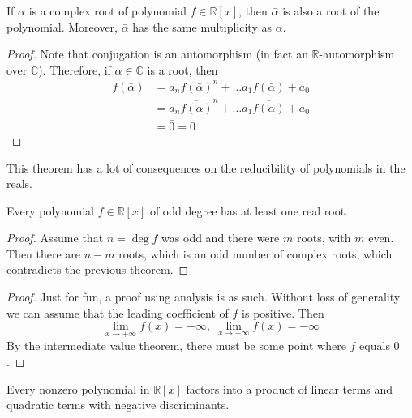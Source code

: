  \begin{theorem}
    If $\alpha$ is a complex root of polynomial $f \in \mathbb{R}[x]$, then $\bar{\alpha}$ is also a root of the polynomial. Moreover, $\bar{\alpha}$ has the same multiplicity as $\alpha$. 
  \end{theorem}
  \begin{proof}
    Note that conjugation is an automorphism (in fact an $\mathbb{R}$-automorphism over $\mathbb{C}$). Therefore, if $\alpha \in \mathbb{C}$ is a root, then 
    \begin{align}
      f(\bar{\alpha}) & = a_n f(\bar{\alpha})^n + \ldots a_1 f(\bar{\alpha}) + a_0 \\ 
                      & = a_n \overline{f(\alpha)}^n + \ldots a_1 \overline{f(\alpha)} + a_0 \\  
                      & = \bar{0} = 0
    \end{align}
  \end{proof}

  This theorem has a lot of consequences on the reducibility of polynomials in the reals. 

  \begin{corollary}
    Every polynomial $f \in \mathbb{R}[x]$ of odd degree has at least one real root. 
  \end{corollary}
  \begin{proof}
    Assume that $n = \deg{f}$ was odd and there were $m$ roots, with $m$ even. Then there are $n - m$ roots, which is an odd number of complex roots, which contradicts the previous theorem. 
  \end{proof}
  \begin{proof}
    Just for fun, a proof using analysis is as such. Without loss of generality we can assume that the leading coefficient of $f$ is positive. Then
    \begin{equation}
      \lim_{x \rightarrow + \infty} f(x) = + \infty, \; \lim_{x \rightarrow -\infty} f(x) = -\infty
    \end{equation}
    By the intermediate value theorem, there must be some point where $f$ equals $0$. 
  \end{proof}

  \begin{corollary}
    Every nonzero polynomial in $\mathbb{R}[x]$ factors into a product of linear terms and quadratic terms with negative discriminants. 
  \end{corollary}

